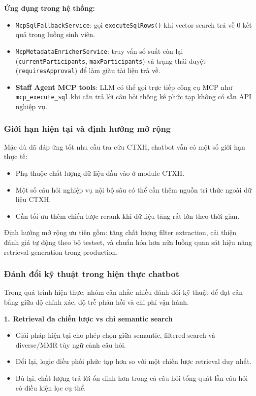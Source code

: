 \textbf{Ứng dụng trong hệ thống:}
\begin{itemize}
	\item \texttt{McpSqlFallbackService}: gọi \texttt{executeSqlRows()} khi vector search trả về 0 kết quả trong luồng sinh viên.
	\item \texttt{McpMetadataEnricherService}: truy vấn số suất còn lại (\texttt{currentParticipants}, \texttt{maxParticipants}) và trạng thái duyệt (\texttt{requiresApproval}) để làm giàu tài liệu trả về.
	\item \textbf{Staff Agent MCP tools}: LLM có thể gọi trực tiếp công cụ MCP như \texttt{mcp\_execute\_sql} khi cần trả lời câu hỏi thống kê phức tạp không có sẵn API nghiệp vụ.
\end{itemize}

\subsubsection{Giới hạn hiện tại và định hướng mở rộng}
Mặc dù đã đáp ứng tốt nhu cầu tra cứu CTXH, chatbot vẫn có một số giới hạn thực tế:
\begin{itemize}
	\item Phụ thuộc chất lượng dữ liệu đầu vào ở module CTXH.
	\item Một số câu hỏi nghiệp vụ nội bộ sâu có thể cần thêm nguồn tri thức ngoài dữ liệu CTXH.
	\item Cần tối ưu thêm chiến lược rerank khi dữ liệu tăng rất lớn theo thời gian.
\end{itemize}

Định hướng mở rộng ưu tiên gồm: tăng chất lượng filter extraction, cải thiện đánh giá tự động theo bộ testset, và chuẩn hóa hơn nữa luồng quan sát hiệu năng retrieval-generation trong production.

\subsubsection{Đánh đổi kỹ thuật trong hiện thực chatbot}
Trong quá trình hiện thực, nhóm cân nhắc nhiều đánh đổi kỹ thuật để đạt cân bằng giữa độ chính xác, độ trễ phản hồi và chi phí vận hành.

\textbf{1. Retrieval đa chiến lược vs chỉ semantic search}
\begin{itemize}
	\item Giải pháp hiện tại cho phép chọn giữa semantic, filtered search và diverse/MMR tùy ngữ cảnh câu hỏi.
	\item Đổi lại, logic điều phối phức tạp hơn so với một chiến lược retrieval duy nhất.
	\item Bù lại, chất lượng trả lời ổn định hơn trong cả câu hỏi tổng quát lẫn câu hỏi có điều kiện lọc cụ thể.
\end{itemize}

